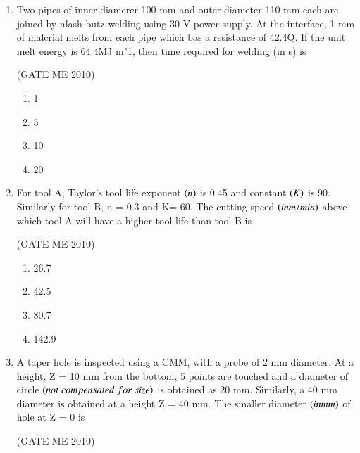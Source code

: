 \documentclass[journal,12pt,onecolumn]{IEEEtran}
\theoremstyle{remark}
\begin{document}
\begin{enumerate}
\item Two pipes of inner diamerer 100 mm and outer diameter 110 mm each are joined by nlash-butz welding using 30 V power supply. At the interface, 1 mm of malcrial melts from each pipe which bas a resistance of 42.4Q. If the unit melt energy is 64.4MJ m"1, then time required for welding (in s) is

\hfill{(GATE  ME 2010)}\\


\begin{multicols}{4}
\begin{enumerate}
\item 1
\item 5
\item 10
\item 20
\end{enumerate}
\end{multicols}

\item For tool A, Taylor's tool life exponent $\left(n\right)$ is 0.45 and constant $\left(K\right)$ is 90. Similarly for tool B, n = 0.3 and K= 60. The cutting speed $\left(inm/min\right)$ above which tool A will have a higher tool life than tool B is

\hfill{(GATE  ME 2010)}\\

\begin{multicols}{4}
\begin{enumerate}
\item 26.7
\item 42.5
\item 80.7
\item 142.9
\end{enumerate}
\end{multicols}

\item A taper hole is inspected using a CMM, with a probe of 2 mm diameter. At a height, Z = 10 mm from the bottom, 5 points are touched and a diameter of circle $\left(not\;compensated\;for\;size\right)$ is obtained as 20 mm. Similarly, a 40 mm diameter is obtained at a height Z = 40 mm. The smaller diameter $\left(in mm\right)$ of hole at Z = 0 is


\hfill{(GATE  ME 2010)}\\


\end{enumerate}
\end{document}
